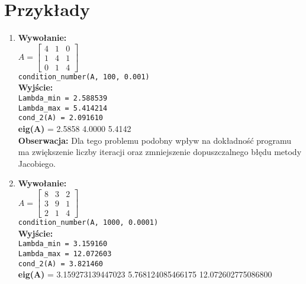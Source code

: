 \documentclass[]{article}
\begin{document}
\section{Przykłady}
\begin{enumerate}
\item \textbf{Wywołanie:}\\
$A = \begin{bmatrix}
4 & 1 & 0\\
1 & 4 & 1\\
0 & 1 & 4
\end{bmatrix}$\\
\verb|condition_number(A, 100, 0.001)|
\\\textbf{Wyjście:}\\
\verb|Lambda_min = 2.588539|\\
\verb|Lambda_max = 5.414214|\\
\verb|cond_2(A) = 2.091610|\\
\textbf{eig(A)} =  2.5858 4.0000 5.4142\\
\textbf{Obserwacja:} Dla tego problemu podobny wpływ na dokładność programu ma zwiększenie liczby iteracji oraz zmniejszenie dopuszczalnego błędu metody Jacobiego.

\item \textbf{Wywołanie:}\\
$A = \begin{bmatrix}
8 & 3 & 2\\
3 & 9 & 1\\
2 & 1 & 4
\end{bmatrix}$\\
\verb|condition_number(A, 1000, 0.0001)|
\\\textbf{Wyjście:}\\
\verb|Lambda_min = 3.159160|\\
\verb|Lambda_max = 12.072603|\\
\verb|cond_2(A) = 3.821460|\\
\textbf{eig(A)} =  3.159273139447023 5.768124085466175 12.072602775086800\\


\end{enumerate}
\end{document}
